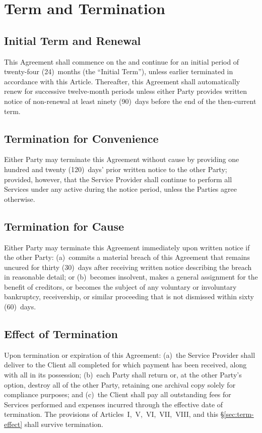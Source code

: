 \section{Term and Termination}

\subsection{Initial Term and Renewal}
This Agreement shall commence on the  and continue for an initial period of twenty-four (24)~months (the ``Initial Term''), unless earlier terminated in accordance with this Article. Thereafter, this Agreement shall automatically renew for successive twelve-month periods unless either Party provides written notice of non-renewal at least ninety (90)~days before the end of the then-current term.

\subsection{Termination for Convenience}
Either Party may terminate this Agreement without cause by providing one hundred and twenty (120)~days' prior written notice to the other Party; provided, however, that the Service Provider shall continue to perform all Services under any active  during the notice period, unless the Parties agree otherwise.

\subsection{Termination for Cause}
Either Party may terminate this Agreement immediately upon written notice if the other Party: (a)~commits a material breach of this Agreement that remains uncured for thirty (30)~days after receiving written notice describing the breach in reasonable detail; or (b)~becomes insolvent, makes a general assignment for the benefit of creditors, or becomes the subject of any voluntary or involuntary bankruptcy, receivership, or similar proceeding that is not dismissed within sixty (60)~days.

\subsection{Effect of Termination}
Upon termination or expiration of this Agreement: (a)~the Service Provider shall deliver to the Client all completed  for which payment has been received, along with all  in its possession; (b)~each Party shall return or, at the other Party's option, destroy all  of the other Party, retaining one archival copy solely for compliance purposes; and (c)~the Client shall pay all outstanding fees for Services performed and expenses incurred through the effective date of termination. The provisions of Articles~I,~V,~VI,~VII,~VIII, and this \S\ref{sec:term-effect} shall survive termination.

